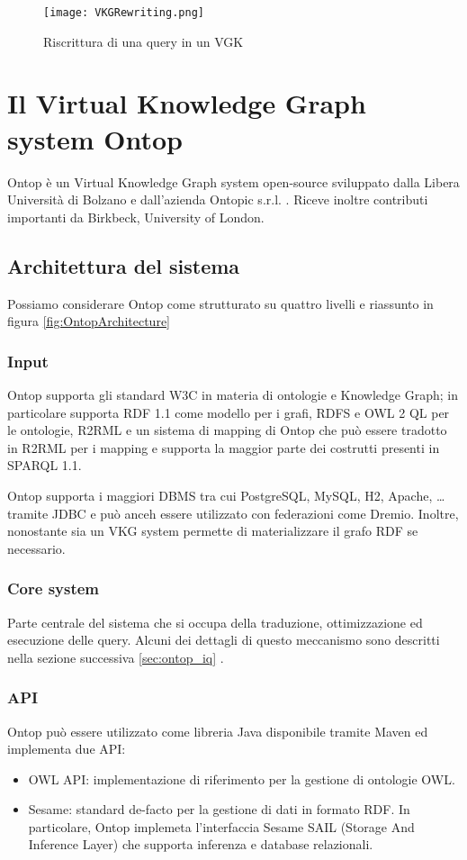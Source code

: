\begin{figure}[h]
    \centering
    \texttt{[image: VKGRewriting.png]}
    \caption{Riscrittura di una query in un VGK}
    \label{fig:VKGRewriting}
\end{figure}


\section{Il Virtual Knowledge Graph system Ontop}
\label{sec:vkg_ontop}
Ontop è un Virtual Knowledge Graph system open-source sviluppato dalla Libera Università di Bolzano e dall'azienda Ontopic s.r.l. . Riceve inoltre
contributi importanti da Birkbeck, University of London.

\subsection{Architettura del sistema}
Possiamo considerare Ontop come strutturato su quattro livelli e riassunto in figura \ref{fig:OntopArchitecture}
\subsubsection*{Input}
Ontop supporta gli standard W3C in materia di ontologie e Knowledge Graph; in particolare supporta RDF 1.1 come modello per i grafi, RDFS e OWL 2 QL per le
ontologie, R2RML e un sistema di mapping di Ontop che può essere tradotto in R2RML per i mapping e supporta la maggior parte dei costrutti presenti in SPARQL 1.1.

Ontop supporta i maggiori DBMS tra cui PostgreSQL, MySQL, H2, Apache, \dots tramite JDBC e può anceh essere utilizzato con federazioni come Dremio.
Inoltre, nonostante sia un VKG system permette di materializzare il grafo RDF se necessario.

\subsubsection*{Core system}
Parte centrale del sistema che si occupa della traduzione, ottimizzazione ed esecuzione delle query. Alcuni dei dettagli di questo meccanismo sono descritti nella
sezione successiva \ref{sec:ontop_iq} \cite{OntopArchitecture}.
\subsubsection*{API}
Ontop può essere utilizzato come libreria Java disponibile tramite Maven ed implementa due API:
\begin{itemize}
    \item OWL API: implementazione di riferimento per la gestione di ontologie OWL.
    \item Sesame: standard de-facto per la gestione di dati in formato RDF. In particolare, Ontop implemeta l'interfaccia Sesame SAIL (Storage And Inference Layer) che supporta 
        inferenza e database relazionali.
\end{itemize}
